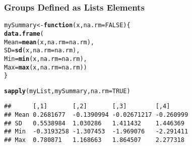 \documentclass[paper=screen,mathserif]{beamer}\usepackage[]{graphicx}\usepackage[]{color}
\makeatletter
\newcommand{\hlnum}[1]{\textcolor[rgb]{0.686,0.059,0.569}{#1}}%
\newcommand{\hlstd}[1]{\textcolor[rgb]{0.345,0.345,0.345}{#1}}%
\newcommand{\hlkwa}[1]{\textcolor[rgb]{0.161,0.373,0.58}{\textbf{#1}}}%
\newcommand{\hlkwb}[1]{\textcolor[rgb]{0.69,0.353,0.396}{#1}}%
\newcommand{\hlkwc}[1]{\textcolor[rgb]{0.333,0.667,0.333}{#1}}%
\newcommand{\hlkwd}[1]{\textcolor[rgb]{0.737,0.353,0.396}{\textbf{#1}}}%
\newenvironment{kframe}{%
 \def\at@end@of@kframe{}%
 \ifinner\ifhmode%
  \def\at@end@of@kframe{\end{minipage}}%
  \begin{minipage}{\columnwidth}%
 \fi\fi%
 \def\FrameCommand##1{\hskip\@totalleftmargin \hskip-\fboxsep
 \colorbox{shadecolor}{##1}\hskip-\fboxsep
     \hskip-\linewidth \hskip-\@totalleftmargin \hskip\columnwidth}%
 \MakeFramed {\advance\hsize-\width
   \@totalleftmargin\z@ \linewidth\hsize
   \@setminipage}}%
 {\par\unskip\endMakeFramed%
 \at@end@of@kframe}
\newenvironment{knitrout}{}{} %
\newcommand{\ft}[1]{\frametitle{#1}}
\makeatother
\begin{document}
\begin{frame}[fragile]
  \ft{Groups Defined as Lists Elements}
  
\begin{knitrout}\scriptsize
{}\color{fgcolor}\begin{kframe}
\begin{alltt}
\hlstd{mySummary} \hlkwb{<-} \hlkwa{function}\hlstd{(}\hlkwc{x}\hlstd{,} \hlkwc{na.rm} \hlstd{=} \hlnum{FALSE}\hlstd{) \{}
    \hlkwd{data.frame}\hlstd{(}
        \hlkwc{Mean} \hlstd{=} \hlkwd{mean}\hlstd{(x,} \hlkwc{na.rm} \hlstd{= na.rm),}
        \hlkwc{SD} \hlstd{=} \hlkwd{sd}\hlstd{(x,} \hlkwc{na.rm} \hlstd{= na.rm),}
        \hlkwc{Min} \hlstd{=} \hlkwd{min}\hlstd{(x,} \hlkwc{na.rm} \hlstd{= na.rm),}
        \hlkwc{Max} \hlstd{=} \hlkwd{max}\hlstd{(x,} \hlkwc{na.rm} \hlstd{= na.rm))}
\hlstd{\}}

\hlkwd{sapply}\hlstd{(myList, mySummary,} \hlkwc{na.rm} \hlstd{=} \hlnum{TRUE}\hlstd{)}
\end{alltt}
\begin{verbatim}
##      [,1]       [,2]       [,3]        [,4]     
## Mean 0.2681677  -0.1390994 -0.02671217 -0.260999
## SD   0.5538984  1.030286   1.411432    1.446369 
## Min  -0.3193258 -1.307453  -1.969076   -2.291411
## Max  0.780871   1.168663   1.864507    2.277318
\end{verbatim}
\end{kframe}
\end{knitrout}
\end{frame}
\end{document}
